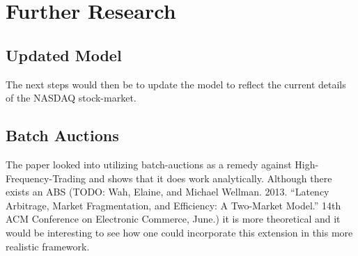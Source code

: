 \section{Further Research}

\subsection{Updated Model}
The next steps would then be to update the model to reflect the current details of the NASDAQ stock-market.

\subsection{Batch Auctions}
The paper \cite{budish_editors_2015} looked into utilizing batch-auctions as a remedy against High-Frequency-Trading and shows that it does work analytically. Although there exists an ABS (TODO: Wah, Elaine, and Michael Wellman. 2013. “Latency Arbitrage, Market Fragmentation, and
Efficiency: A Two-Market Model.” 14th ACM Conference on Electronic Commerce, June.) it is more theoretical and it would be interesting to see how one could incorporate this extension in this more realistic framework.

